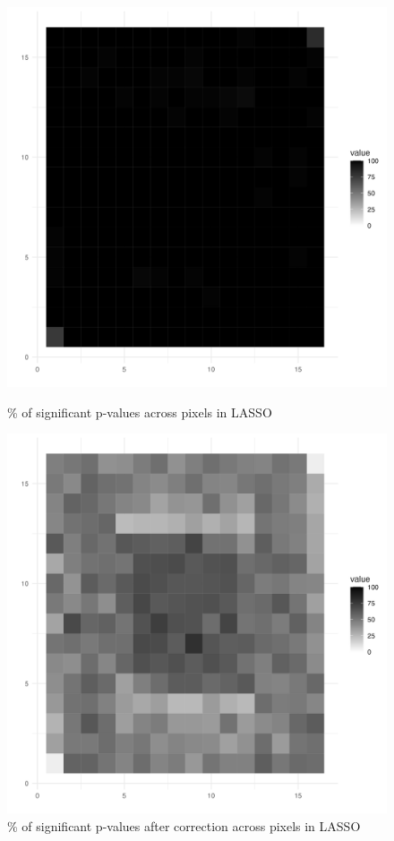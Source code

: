 \documentclass[12pt]{article}
\begin{document}
\begin{figure}[H]
    \centering
    \begin{minipage}[b]{0.45\textwidth}
        \includegraphics[width=\textwidth]{../Figures/lasso_pvals.png}
        \caption{\% of significant p-values across pixels in LASSO}
    \end{minipage}
    \hfill %
    \begin{minipage}[b]{0.45\textwidth}
        \includegraphics[width=\textwidth]{../Figures/lasso_pvals_corr.png}
        \caption{\% of significant p-values after correction across pixels in LASSO}
    \end{minipage}
\end{figure}
\end{document}
